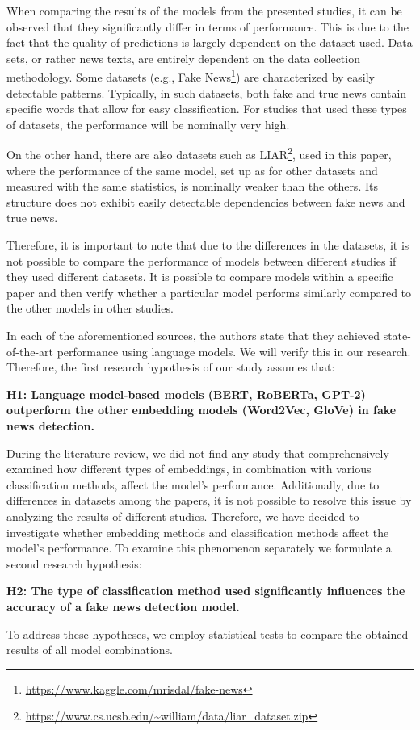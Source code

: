 When comparing the results of the models from the presented studies, it can be observed that they significantly differ in terms of performance. This is due to the fact that the quality of predictions is largely dependent on the dataset used. Data sets, or rather news texts, are entirely dependent on the data collection methodology. Some datasets (e.g., Fake News\footnote{\url{https://www.kaggle.com/mrisdal/fake-news}}) are characterized by easily detectable patterns. Typically, in such datasets, both fake and true news contain specific words that allow for easy classification. For studies that used these types of datasets, the performance will be nominally very high.

On the other hand, there are also datasets such as LIAR\footnote{\url{https://www.cs.ucsb.edu/~william/data/liar_dataset.zip}}, used in this paper, where the performance of the same model, set up as for other datasets and measured with the same statistics, is nominally weaker than the others. Its structure does not exhibit easily detectable dependencies between fake news and true news.

Therefore, it is important to note that due to the differences in the datasets, it is not possible to compare the performance of models between different studies if they used different datasets. It is possible to compare models within a specific paper and then verify whether a particular model performs similarly compared to the other models in other studies.

In each of the aforementioned sources, the authors state that they achieved state-of-the-art performance using language models. We will verify this in our research.  Therefore, the first research hypothesis of our study assumes that:
\vspace{0.2cm}

\noindent\textbf{H1: Language model-based models (BERT, RoBERTa, GPT-2) outperform the other embedding models (Word2Vec, GloVe) in fake news detection.}
\vspace{0.2cm}

During the literature review, we did not find any study that comprehensively examined how different types of embeddings, in combination with various classification methods, affect the model's performance. Additionally, due to differences in datasets among the papers, it is not possible to resolve this issue by analyzing the results of different studies. Therefore, we have decided to investigate whether embedding methods and classification methods affect the model's performance. 
To examine this phenomenon separately we formulate a second research hypothesis:
\vspace{0.2cm}

\noindent\textbf{H2: The type of classification method used significantly influences the accuracy of a fake news detection model.}
\vspace{0.2cm}

To address these hypotheses, we  employ statistical tests to compare the obtained results of all model combinations.